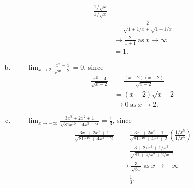 \documentclass[12pt]{article}
\begin{document}
\begin{enumerate}[a)]
\begin{equation*}
\begin{split}
        \frac{1/\sqrt{x}}{1/\sqrt{x}}
        \\
        & = \frac{2}{\sqrt{1 + 1/x} + \sqrt{1 - 1/x}} 
        \\
        & \to \frac{2}{1 + 1} \ \text{as} \ x \to \infty
        \\
        & = 1.
        \end{split}
        \end{equation*}
        \item{}
            \vspace{8em}
        $\qquad \displaystyle \lim_{x \to 2} \frac{x^{2} - 4}{ \sqrt{x -2}}= 0 $, since
        \begin{equation*}
        \begin{split}
          \frac{x^{2} - 4}{\sqrt{x-2}} & = \frac{(x+2)(x-2)}{\sqrt{x-2}} 
          \\
          & = (x+2)\sqrt{x-2}
          \\
          & \to 0 \ \text{as} \ x \to 2.
        \end{split}
        \end{equation*}
        \item{}
            \vspace{8em}
            $\qquad \displaystyle \lim_{x \to -\infty} \frac{3x^{5} + 2x^{2} + 1}{\sqrt{81x^{10}  + 4x^{3} + 2}} = \frac{1}{3}$, since
            \begin{equation*}
            \begin{split}
            \frac{3x^{5} + 2x^{2} + 1}{\sqrt{81x^{10}  + 4x^{3} + 2}} 
            & = \frac{3x^{5} + 2x^{2} + 1}{\sqrt{81x^{10}  + 4x^{3} + 2}}\left( \frac{1/x^{5}}{1/x^{5}} \right) 
            \\
            & = \frac{3 + 2/x^{3} + 1/x^{5}}{\sqrt{81  + 4/x^{7} + 2/x^{10}}} 
            \\
            & \to \frac{3}{\sqrt{81}} \ \text{as} \ x \to -\infty
            \\
            & = \frac{1}{3}.
            \end{split}
            \end{equation*}
\end{enumerate}
\end{document}
